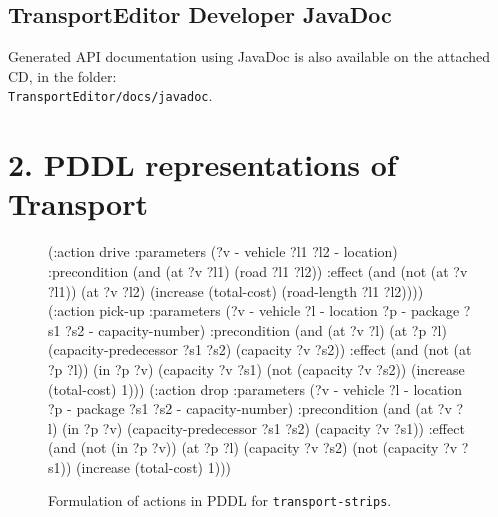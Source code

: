 \subsection*{TransportEditor Developer JavaDoc}\label{transporteditor-developer-javadoc}

Generated API documentation using JavaDoc is also available on the attached CD, in the folder:\\
\verb+TransportEditor/docs/javadoc+.

\newpage

\section*{2. PDDL representations of Transport}\label{pddl-repr}

\begin{figure}[h]
\begin{code}
(:action drive
  :parameters (?v - vehicle ?l1 ?l2 - location)
  :precondition (and
      (at ?v ?l1)
      (road ?l1 ?l2))
  :effect (and
      (not (at ?v ?l1))
      (at ?v ?l2)
      (increase (total-cost) (road-length ?l1 ?l2))))
(:action pick-up
  :parameters (?v - vehicle ?l - location ?p - package
               ?s1 ?s2 - capacity-number)
  :precondition (and
      (at ?v ?l)
      (at ?p ?l)
      (capacity-predecessor ?s1 ?s2)
      (capacity ?v ?s2))
  :effect (and
      (not (at ?p ?l))
      (in ?p ?v)
      (capacity ?v ?s1)
      (not (capacity ?v ?s2))
      (increase (total-cost) 1)))
(:action drop
  :parameters (?v - vehicle ?l - location ?p - package
               ?s1 ?s2 - capacity-number)
  :precondition (and
      (at ?v ?l)
      (in ?p ?v)
      (capacity-predecessor ?s1 ?s2)
      (capacity ?v ?s1))
  :effect (and
      (not (in ?p ?v))
      (at ?p ?l)
      (capacity ?v ?s2)
      (not (capacity ?v ?s1))
      (increase (total-cost) 1)))
\end{code}
\caption*{Formulation of actions in PDDL for \texttt{transport-strips}.}
\label{code:pddl-strips}
\end{figure}

